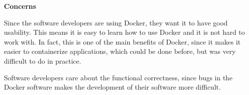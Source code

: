 \textbf{Concerns}
\begin{description}[labelwidth=6cm,labelindent=30pt,style=multiline,leftmargin=5.5cm,font=\normalfont\itshape]




\item[\textbf{Usability}] Since the software developers are using Docker, they want it to have good usability. This means it is easy to learn how to use Docker and it is not hard to work with. In fact, this is one of the main benefits of Docker, since it makes it easier to containerize applications, which could be done before, but was very difficult to do in practice.


\item[\textbf{Functional Suitability}: (Functional correctness)] Software developers care about the functional correctness, since bugs in the Docker software makes the development of their software more difficult. 

\end{description}

